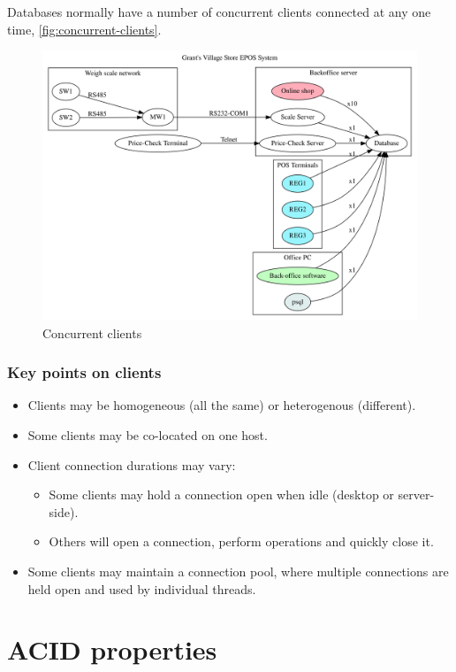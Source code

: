 Databases normally have a number of concurrent clients connected at any one time, \autoref{fig:concurrent-clients}.

\begin{figure}[htbp]
  \centering
  \includegraphics[width=1.0\linewidth]{concurrent_clients}
  \caption{Concurrent clients}
  \label{fig:concurrent-clients}
\end{figure}

\subsubsection{Key points on clients}

\begin{itemize}
\item Clients may be homogeneous (all the same) or heterogenous (different).
\item Some clients may be co-located on one host.
\item Client connection durations may vary:
  \begin{itemize}
  \item Some clients may hold a connection open when idle (desktop or server-side).
  \item Others will open a connection, perform operations and quickly close it.
  \end{itemize}
\item Some clients may maintain a connection pool, where multiple connections are held open and used by individual threads.
\end{itemize}


\section{ACID properties}

